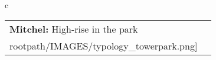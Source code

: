\begin{table}[H]
        \begin{tabular}{c}
        \begin{tabular}{m{1.5in} m{2in}}
\textbf{Mitchel:} {High-rise in the park} & \texttt{[image: \\rootpath/IMAGES/typology\_towerpark.png]}
\end{tabular}\end{tabular}
        \end{table}